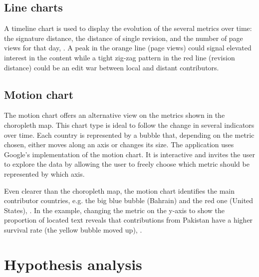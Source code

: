 \subsection{Line charts}

A timeline chart is used to display the evolution of the several metrics over time: the signature distance, the distance of single revision, and the number of page views for that day, .
A peak in the orange line (page views) could signal elevated interest in the content while a tight zig-zag pattern in the red line (revision distance) could be an edit war between local and distant contributors.


\subsection{Motion chart}

The motion chart offers an alternative view on the metrics shown in the choropleth map.
This chart type is ideal to follow the change in several indicators over time.
Each country is represented by a bubble that, depending on the metric chosen, either moves along an axis or changes its size.
The application uses Google's implementation of the motion chart.
It is interactive and invites the user to explore the data by allowing the user to freely choose which metric should be represented by which axis.


Even clearer than the choropleth map, the motion chart identifies the main contributor countries, e.g. the big blue bubble (Bahrain) and the red one (United States), .
In the example, changing the metric on the y-axis to show the proportion of located text reveals that contributions from Pakistan have a higher survival rate (the yellow bubble moved up), . 



\section{Hypothesis analysis}\label{hypothesesanalysis}

